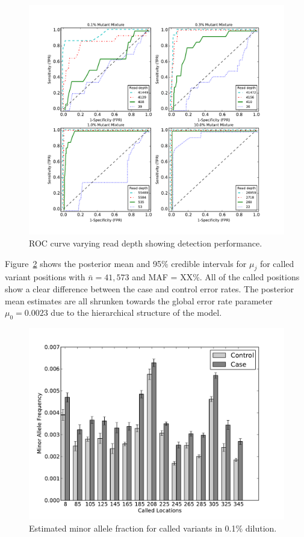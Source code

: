 \documentclass[11pt,reqno]{amsart}
\begin{document}
\begin{figure}[htbp]
\begin{center}
\includegraphics[width=120mm]{pdf_figs/ROC_without_chi2.pdf}
\caption{ROC curve varying read depth showing detection performance.}
\label{fig:ROC}
\end{center}
\end{figure}

Figure~\ref{fig:MAF} shows the posterior mean and 95\% credible intervals for $\mu_j$ for called variant positions with $\bar{n} = 41,573$ and MAF = XX\%. All of the called positions show a clear difference between the case and control error rates. The posterior mean estimates are all shrunken towards the global error rate parameter $\mu_0 = 0.0023$ due to the hierarchical structure of the model.

\begin{figure}[h]
\begin{center}
\includegraphics[width=120mm]{pdf_figs/Synthetic_MuBarPlot.pdf}
\caption{Estimated minor allele fraction for called variants in 0.1\% dilution.}
\label{fig:MAF}
\end{center}
\end{figure}
\end{document}
